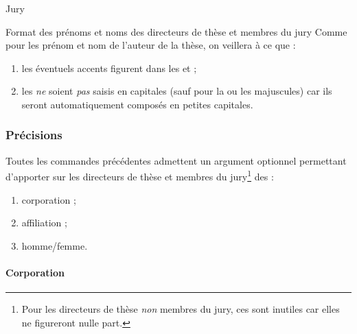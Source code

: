 \begin{dbexample}{Jury}{}
\begin{preamblecode}[listing options={deletekeywords={[5]supervisor,cosupervisor,committeepresident}}]
%
%
%
\end{preamblecode}
\end{dbexample}

\begin{dbwarning}{Format des prénoms et noms des directeurs de thèse et membres du jury}{}
  Comme pour les prénom et nom de l'auteur de la thèse, on veillera à ce que :
  \begin{enumerate}
  \item les éventuels accents figurent dans les  et ;
  \item les  \emph{ne} soient \emph{pas} saisis en capitales (sauf
    pour la ou les majuscules) car ils seront automatiquement composés en
    petites capitales.
  \end{enumerate}
\end{dbwarning}

\subsubsection{Précisions}\label{sec-options-staff}

Toutes les commandes précédentes admettent un argument optionnel permettant
d'apporter sur les directeurs de thèse et membres du jury\footnote{Pour les
  directeurs de thèse \emph{non} membres du jury, ces  sont
  inutiles car elles ne figureront nulle part.}
des  :
\begin{enumerate}
\item corporation ;
\item affiliation ;
\item homme/femme.
\end{enumerate}

\paragraph{Corporation}
\label{sec-corps}%
%
%
%
%
%
%
%
%

